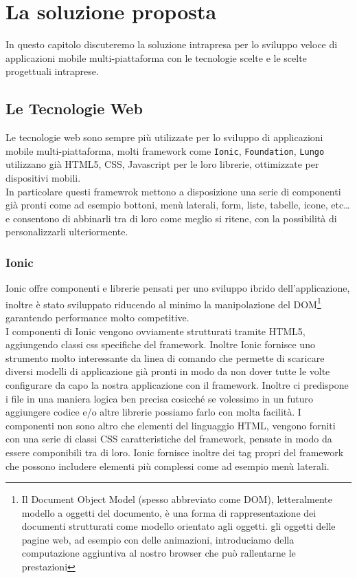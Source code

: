 \chapter{La soluzione proposta}
In questo capitolo discuteremo la soluzione intrapresa per lo sviluppo veloce di applicazioni mobile multi-piattaforma con le tecnologie scelte e le scelte progettuali intraprese. 
\section{Le Tecnologie Web}
Le tecnologie web sono sempre più utilizzate per lo sviluppo di applicazioni mobile multi-piattaforma, molti framework come \texttt{Ionic}, \texttt{Foundation}, \texttt{Lungo} utilizzano già HTML5, CSS, Javascript per le loro librerie, ottimizzate per dispositivi mobili.\\
In particolare questi framewrok mettono a disposizione una serie di componenti già pronti come ad esempio bottoni, menù laterali, form, liste, tabelle, icone, etc\dots e consentono di abbinarli tra di loro come meglio si ritene, con la possibilità di personalizzarli ulteriormente.\\
\subsection{Ionic}

Ionic offre componenti e librerie pensati per uno sviluppo ibrido dell'applicazione, inoltre è stato sviluppato riducendo al minimo la manipolazione del DOM\footnote{Il Document Object Model (spesso abbreviato come DOM), letteralmente modello a oggetti del documento, è una forma di rappresentazione dei documenti strutturati come modello orientato agli oggetti.\cite{wiki:dom} gli oggetti delle pagine web, ad esempio con delle animazioni, introduciamo della computazione aggiuntiva al nostro browser che può rallentarne le prestazioni} garantendo performance molto competitive.\\
I componenti di Ionic vengono ovviamente strutturati tramite HTML5, aggiungendo classi css specifiche del framework. Inoltre 
Ionic fornisce uno strumento molto interessante da linea di comando che permette di scaricare diversi modelli di applicazione già pronti in modo da non dover tutte le volte configurare da capo la nostra applicazione con il framework. Inoltre ci predispone i file in una maniera logica ben precisa cosicché se volessimo in un futuro aggiungere codice e/o altre librerie possiamo farlo con molta facilità.
I componenti non sono altro che elementi del linguaggio HTML, vengono forniti con una serie di classi CSS caratteristiche del framework, pensate in modo da essere componibili tra di loro. Ionic fornisce inoltre dei tag propri del framework che possono includere elementi più complessi come ad esempio menù laterali.

